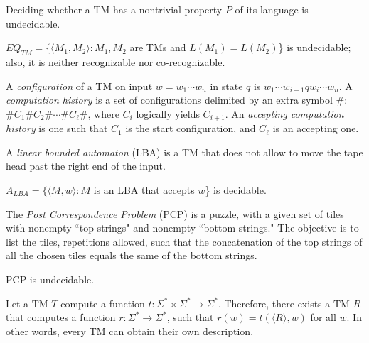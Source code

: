 \begin{theorem}
Deciding whether a TM has a nontrivial property $P$ of its language is undecidable.
\end{theorem}

\begin{theorem}
$EQ_{TM} = \{\langle M_1, M_2 \rangle : M_1, M_2$ are TMs and $L(M_1) = L(M_2)$\} is undecidable; also, it is neither recognizable nor co-recognizable.
\end{theorem}

\begin{definition}
A \emph{configuration} of a TM on input $w = w_1\cdots w_n$ in state $q$ is $w_1\cdots w_{i-1}qw_i\cdots w_n$. A \emph{computation history} is a set of configurations delimited by an extra symbol \#: $\#C_1\#C_2\#\cdots\#C_{\ell}\#$, where $C_i$ logically yields $C_{i+1}$. An \emph{accepting computation history} is one such that $C_1$ is the start configuration, and $C_{\ell}$ is an accepting one.
\end{definition}

\begin{definition}
A \emph{linear bounded automaton} (LBA) is a TM that does not allow to move the tape head past the right end of the input.
\end{definition}

\begin{theorem}
$A_{LBA} = \{\langle M, w\rangle : M$ is an LBA that accepts $w$\} is decidable.
\end{theorem}

\begin{definition}
The \emph{Post Correspondence Problem} (PCP) is a puzzle, with a given set of tiles with nonempty ``top strings" and nonempty ``bottom strings." The objective is to list the tiles, repetitions allowed, such that the concatenation of the top strings of all the chosen tiles equals the same of the bottom strings.
\end{definition}

\begin{theorem}
PCP is undecidable.
\end{theorem}

\begin{theorem}
Let a TM $T$ compute a function $t: \Sigma^* \times \Sigma^* \rightarrow \Sigma^*$. Therefore, there exists a TM $R$ that computes a function $r: \Sigma^* \rightarrow \Sigma^*$, such that $r(w) = t(\langle R \rangle, w)$ for all $w$. In other words, every TM can obtain their own description.
\end{theorem}

